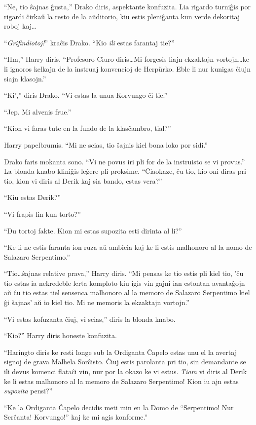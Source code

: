 ``Ne, tio ŝajnas ĝusta,'' Drako diris, aspektante konfuzita. Lia
rigardo turniĝis por rigardi ĉirkaŭ la resto de la aŭditorio, kiu
estis pleniĝanta kun verde dekoritaj roboj kaj\ldots

``\emph{Grifindiotoj!}'' kraĉis Drako. ``Kio \emph{ili} estas farantaj
tie?''

``Hm,'' Harry diris. ``Profesoro Ciuro diris\ldots Mi forgesis liajn
ekzaktajn vortojn\ldots ke li ignoros kelkajn de la instruaj
konvencioj de Herpŭrko. Eble li nur kunigas ĉiujn siajn klasojn.''

``Ki','' diris Drako. ``Vi estas la unua Korvungo ĉi tie.''

``Jep. Mi alvenis frue.''

``Kion vi faras tute en la fundo de la klasĉambro, tial?''

Harry papelbrumis. ``Mi ne scias, tio ŝajnis kiel bona loko por
sidi.''

Drako faris mokanta sono. ``Vi ne povus iri pli for de la instruisto
se vi provus.'' La blonda knabo kliniĝis leĝere pli
proksime. ``Ĉiaokaze, ĉu tio, kio oni diras pri tio, kion vi
diris al Derik kaj sia bando, estas vera?''

``Kiu estas Derik?''

``Vi frapis lin kun torto?''

``Du tortoj fakte. Kion mi estas supozita esti dirinta al li?''

``Ke li ne estis faranta ion ruza aŭ ambicia kaj ke li estis malhonoro al
la nomo de Salazaro Serpentimo.''

``Tio\ldots ŝajnas relative prava,'' Harry diris. ``Mi pensas ke tio
estis pli kiel tio, 'ĉu tio estas ia nekredeble lerta komploto kiu
igis vin gajni ian estontan avantaĝojn aŭ ĉu tio estas tiel sensenca
malhonoro al la memoro de Salazaro Serpentimo kiel ĝi ŝajnas' aŭ io
kiel tio. Mi ne memoris la ekzaktajn vortojn.''

``Vi estas kofuzanta ĉiuj, vi scias,'' diris la blonda knabo.

``Kio?'' Harry diris honeste konfuzita.

``Haringto diris ke resti longe sub la Ordiganta Ĉapelo estas unu el
la avertaj signoj de grava Malhela Sorĉisto. Ĉiuj estis parolanta pri
tio, sin demandante se ili devus komenci flataĉi vin, nur por la okazo
ke vi estus. \emph{Tiam} vi diris al Derik ke li estas malhonoro al la
memoro de Salazaro Serpentimo! Kion iu ajn estas \emph{supozita}
pensi?''

``Ke la Ordiganta Ĉapelo decidis meti min en la Domo de ``Serpentimo!
Nur Serĉanta! Korvungo!'' kaj ke mi agis konforme.''

